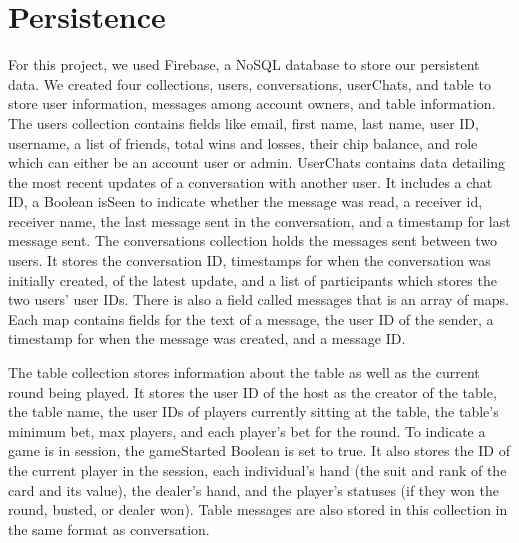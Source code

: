 \section{Persistence}

For this project, we used Firebase, a NoSQL database to store our persistent data. We created four collections, users, conversations, userChats, and table to store user information, messages among account owners, and table information. The users collection contains fields like email, first name, last name, user ID, username, a list of friends, total wins and losses, their chip balance, and role which can either be an account user or admin. UserChats contains data detailing the most recent updates of a conversation with another user. It includes a chat ID, a Boolean isSeen to indicate whether the message was read, a receiver id, receiver name, the last message sent in the conversation, and a timestamp for last message sent. The conversations collection holds the messages sent between two users. It stores the conversation ID, timestamps for when the conversation was initially created, of the latest update, and a list of participants which stores the two users’ user IDs. There is also a field called messages that is an array of maps. Each map contains fields for the text of a message, the user ID of the sender, a timestamp for when the message was created, and a message ID.

 The table collection stores information about the table as well as the current round being played. It stores the user ID of the host as the creator of the table, the table name, the user IDs of players currently sitting at the table, the table’s minimum bet, max players, and each player’s bet for the round. To indicate a game is in session, the gameStarted Boolean is set to true. It also stores the ID of the current player in the session, each individual’s hand (the suit and rank of the card and its value), the dealer’s hand, and the player’s statuses (if they won the round, busted, or dealer won). Table messages are also stored in this collection in the same format as conversation.

 \pagebreak

